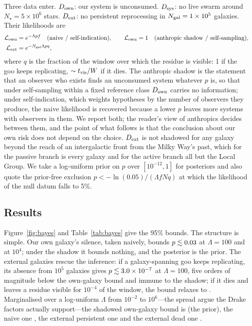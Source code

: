 \documentclass[11pt]{article}
\begin{document}
Three data enter.  $D_{\rm own}$: our system is unconsumed.  $D_{\rm sys}$: no
live swarm around $N_\star=5\times10^{6}$ stars.  $D_{\rm ext}$: no persistent
reprocessing in $N_{\rm gal}=1\times10^{5}$ galaxies.  Their likelihoods are
\begin{align}
\mathcal{L}_{\rm own} &= e^{-\Lambda p f} \quad\text{(naive / self-indication)},
\qquad \mathcal{L}_{\rm own}=1 \quad\text{(anthropic shadow / self-sampling)},\\
\mathcal{L}_{\rm ext} &= e^{-N_{\rm gal}\Lambda p q},
\end{align}
where $q$ is the fraction of the window over which the residue is visible: 1
if the goo keeps replicating, $\sim t_{\rm vis}/W$ if it dies.  The anthropic
shadow \citep{Cirkovic2010} is the statement that an observer who exists finds
an unconsumed system whatever $p$ is, so that under self-sampling within a
fixed reference class $D_{\rm own}$ carries no information; under
self-indication, which weights hypotheses by the number of observers they
produce, the naive likelihood is recovered because a lower $p$ leaves more
systems with observers in them.  We report both; the reader's view of
anthropics decides between them, and the point of what follows is that the
conclusion about our own risk does not depend on the choice.  $D_{\rm ext}$ is
not shadowed for any galaxy beyond the reach of an intergalactic front from
the Milky Way's past, which for the passive branch is every galaxy and for
the active branch all but the Local Group.  We take a log-uniform prior on $p$
over $[10^{-12},1]$ for posteriors and also quote the prior-free exclusion
$p<-\ln(0.05)/(\Lambda f N q)$ at which the likelihood of the null datum falls
to 5\%.

\subsection{Results}

Figure~\ref{fig:bayes} and Table~\ref{tab:bayes} give the 95\% bounds.  The
structure is simple.  Our own galaxy's silence, taken naively, bounds
$p\lesssim0.03$ at $\Lambda=100$ and \LbOwnLamTenK at $10^{4}$;
under the shadow it bounds nothing, and the posterior is the prior.  The
external galaxies rescue the inference: if a galaxy-spanning goo keeps
replicating, its absence from $10^{5}$ galaxies gives
$p\lesssim3.0\times10^{-7}$ at $\Lambda=100$, five orders of magnitude
below the own-galaxy bound and immune to the shadow; if it dies and leaves a
residue visible for $10^{-4}$ of the window, the bound relaxes to
\LbExtDeadLamHundred.  Marginalised over a log-uniform $\Lambda$ from
$10^{-2}$ to $10^{6}$---the spread \citet{Sandberg2018} argue the Drake
factors actually support---the shadowed own-galaxy bound is
\PmargShadow (the prior), the naive one \PmargNaive, the external persistent
one \PmargExtPersist and the external dead one \PmargExtDead.
\end{document}
